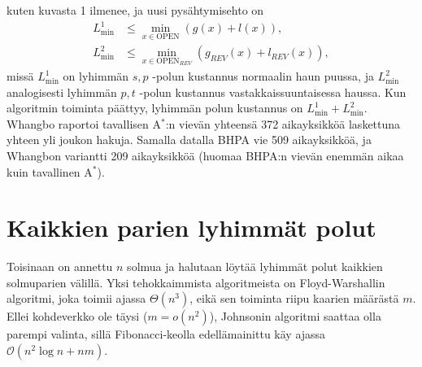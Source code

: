 \documentclass[finnish]{tktltiki2}
\theoremstyle{definition}
\theoremstyle{remark}
\begin{document}
kuten kuvasta 1 ilmenee, ja uusi pysähtymisehto on
\begin{align*}
L^1_{\min} & \leq \underset{x \in \text{OPEN}}{\min} (g(x) + l(x)), \\
L^2_{\min} & \leq \underset{x \in \text{OPEN}_{REV}}{\min} (g_{REV}(x) + l_{REV}(x)),
\end{align*}
missä $L_{\min}^1$ on lyhimmän $s, p$ -polun kustannus normaalin haun puussa, ja $L_{\min}^2$ analogisesti lyhimmän $p, t$ -polun kustannus vastakkaissuuntaisessa haussa. Kun algoritmin toiminta päättyy, lyhimmän polun kustannus on $L^1_{\min} + L^2_{\min}$. Whangbo raportoi tavallisen A$^{\ast}$:n vievän yhteensä 372 aikayksikköä laskettuna yhteen yli joukon hakuja. Samalla datalla BHPA vie 509 aikayksikköä, ja Whangbon variantti 209 aikayksikköä (huomaa BHPA:n vievän enemmän aikaa kuin tavallinen A$^{\ast}$).

\section{Kaikkien parien lyhimmät polut}
\label{sec:allpairs}
Toisinaan on annettu $n$ solmua ja halutaan löytää lyhimmät polut kaikkien solmuparien välillä. Yksi tehokkaimmista algoritmeista on Floyd-Warshallin algoritmi, joka toimii ajassa $\Theta(n^3)$, eikä sen toiminta riipu kaarien määrästä $m$. Ellei kohdeverkko ole täysi ($m = o(n^2)$), Johnsonin algoritmi saattaa olla parempi valinta, sillä Fibonacci-keolla edellämainittu käy ajassa $\mathcal{O}(n^2 \log n + nm)$. 
\end{document}
